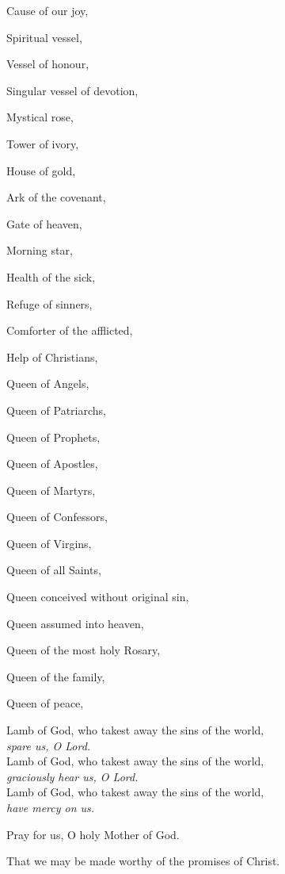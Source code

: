 \begin{multicols}{2}
\begin{hangparas}{1em}{1}
Cause of our joy,

Spiritual vessel,

Vessel of honour,

Singular vessel of devotion,

Mystical rose,



Tower of ivory,

House of gold,

Ark of the covenant,

Gate of heaven,

Morning star,

Health of the sick,

Refuge of sinners,

Comforter of the afflicted,

Help of Christians,

Queen of Angels,

Queen of Patriarchs,

Queen of Prophets,

Queen of Apostles,

Queen of Martyrs,

Queen of Confessors,

Queen of Virgins,

Queen of all Saints,

Queen conceived without original sin,

Queen assumed into heaven,

Queen of the most holy Rosary,

Queen of the family,

Queen of peace,
\end{hangparas}
\end{multicols}

Lamb of God, who takest away the sins of the world,\\
\qquad \textit{spare us, O Lord.}\\
Lamb of God, who takest away the sins of the world,\\
\qquad \textit{graciously hear us, O Lord.}\\
Lamb of God, who takest away the sins of the world,\\
\qquad \textit{have mercy on us.}


\bigskip

\begin{hangparas}{1em}{-1}
\parskip0mm
\Vbar Pray for us, O holy Mother of God.

\Rbar That we may be made worthy of the promises of Christ.
\end{hangparas}

